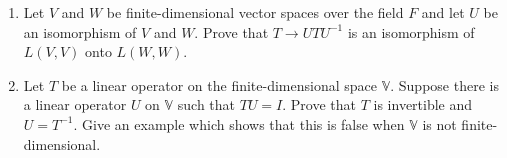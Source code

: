 \begin{enumerate}[label=\thesubsection.\arabic*.,ref=\thesubsection.\theenumi]
\begin{enumerate}
\solution

\end{enumerate}
\item Let $V$ and $W$ be finite-dimensional vector spaces over the field $F$ and let $U$ be an isomorphism of $V$ and $W$. Prove that $T \rightarrow UTU^{-1}$ is an isomorphism of $L(V,V)$ onto $L(W,W)$.
%
\\
\solution

%
\item Let $T$ be a linear operator on the finite-dimensional space $\mathbb{V}$. Suppose there is a linear operator $U$ on $\mathbb{V}$ such that $TU = I$. Prove that $T$ is invertible and $U = T^{-1}$. Give an example which shows that this is false when $\mathbb{V}$ is not finite-dimensional.
%
\\
\solution

\end{enumerate}
